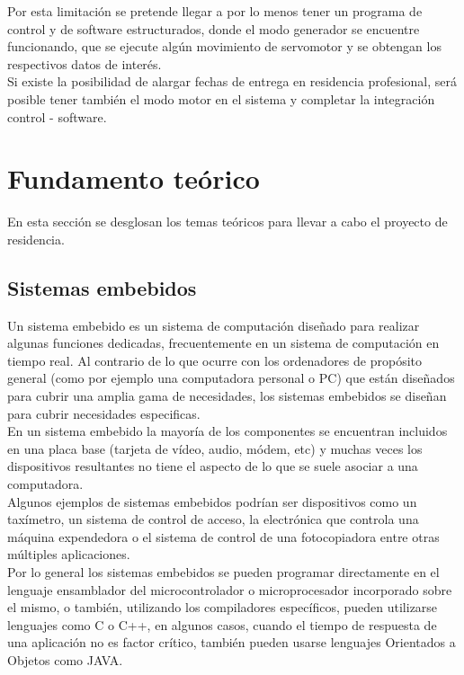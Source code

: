 \documentclass[12pt,titlepage]{article}
\begin{document}
Por esta limitación se pretende llegar a por lo menos  tener un programa de control y de software estructurados,  donde el modo generador se encuentre funcionando, que se ejecute algún movimiento de servomotor y se obtengan los respectivos datos de interés. \\[2.5mm]
Si existe la posibilidad de alargar fechas de entrega en residencia profesional, será posible tener también el modo motor en el sistema y completar la integración control - software. \\

\newpage
\section{Fundamento teórico}
En esta sección se desglosan los temas teóricos para llevar a cabo el proyecto de residencia. \\
\subsection{Sistemas embebidos}
Un sistema embebido es un sistema de computación diseñado para realizar algunas funciones dedicadas, frecuentemente en un sistema de computación en tiempo real. Al contrario de lo que ocurre con los ordenadores de propósito general (como por ejemplo una computadora personal o PC) que están diseñados para cubrir una amplia gama de necesidades, los sistemas embebidos se diseñan para cubrir necesidades especificas. \\[2.5mm] En un sistema embebido la mayoría de los componentes se encuentran incluidos en una placa base (tarjeta de vídeo, audio, módem, etc) y muchas veces los dispositivos resultantes no tiene el aspecto de lo que se suele asociar a una computadora. \\[2.8mm] Algunos ejemplos de sistemas embebidos podrían ser dispositivos como un taxímetro, un sistema de control de acceso, la electrónica que controla una máquina expendedora o el sistema de control de una fotocopiadora entre otras múltiples aplicaciones. \\[2.8mm]

Por lo general los sistemas embebidos se pueden programar directamente en el lenguaje ensamblador del microcontrolador o microprocesador incorporado sobre el mismo, o también, utilizando los compiladores específicos, pueden utilizarse lenguajes como C o C++,  en algunos casos, cuando el tiempo de respuesta de una aplicación no es factor crítico, también pueden usarse lenguajes Orientados a Objetos como JAVA.  \\[2.8mm]
\end{document}
